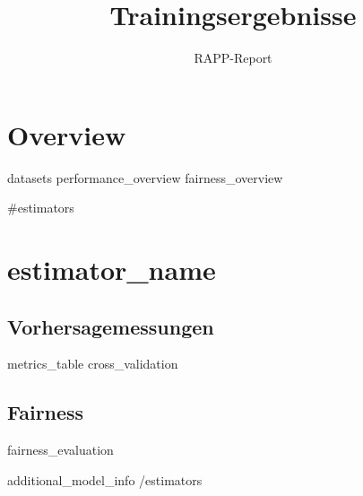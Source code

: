 \documentclass{hhuarticle}
\author{RAPP-Report}
\title{Trainingsergebnisse}
\begin{document}
\maketitle

\tableofcontents

\section{Overview}

{{{datasets}}}
{{{performance_overview}}}
{{{fairness_overview}}}

{{#estimators}}
\clearpage
\section{ {{estimator_name}} }

\subsection{Vorhersagemessungen}
{{{metrics_table}}}
{{{cross_validation}}}

\subsection{Fairness}
{{{fairness_evaluation}}}

{{{additional_model_info}}}
{{/estimators}}
\end{document}
